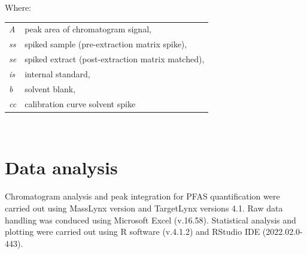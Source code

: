 Where: \newline
\newline
\begin{tabular}{p{1cm}p{20cm}}
    \textit{A}   & peak area of chromatogram signal, \\
    \textit{ss}  & spiked sample (pre-extraction matrix spike), \\
    \textit{se}  & spiked extract (post-extraction matrix matched), \\
    \textit{is}  & internal standard, \\
    \textit{b}   & solvent blank, \\
    \textit{cc}  & calibration curve solvent spike \\
\end{tabular} \\


\section{Data analysis}
Chromatogram analysis and peak integration for PFAS quantification were carried out using MassLynx version and TargetLynx versions 4.1.  Raw data handling was conduced using Microsoft Excel (v.16.58). Statistical analysis and plotting were carried out using R software (v.4.1.2) and RStudio IDE (2022.02.0-443).

